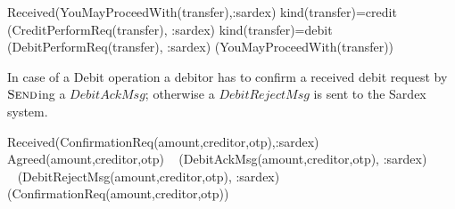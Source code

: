 \begin{asm}
\IF Received(YouMayProceedWith(transfer),\FROM :sardex) \THEN \+
\IF kind(transfer)=credit \THEN \+
   (CreditPerformReq(transfer), \TO :sardex) \-
\IF kind(transfer)=debit \THEN \+
   (DebitPerformReq(transfer), \TO :sardex)  \-
(YouMayProceedWith(transfer))
\end{asm}

In case of a Debit operation a debitor has to confirm a received debit request by $\hbox{\sc Send}$ing a $DebitAckMsg$; otherwise a $DebitRejectMsg$ is sent to the Sardex system.
\begin{asm}
\IF Received(ConfirmationReq(amount,creditor,otp),\FROM :sardex) \THEN \+
   \IF Agreed(amount,creditor,otp)\+
       \THEN ~ (DebitAckMsg(amount,creditor,otp), \TO :sardex) \\
       \ELSE ~ (DebitRejectMsg(amount,creditor,otp), \TO :sardex)\-
   (ConfirmationReq(amount,creditor,otp))
\end{asm}

 

















\def\note#1{}






